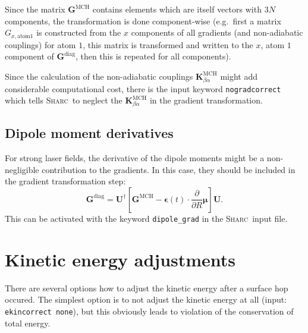 \documentclass[a4paper,11pt,DIV=15,openany,twoside=false]{scrbook}
\newcommand{\sharc}{\textsc{Sharc}}
\newcommand{\ttt}[1]{\texttt{#1}}
\renewcommand{\vec}[1]{\ensuremath{\mathbf{#1}}}
\begin{document}
Since the matrix $\vec{G}^{\text{MCH}}$ contains elements which are itself vectors with $3N$ components, the transformation is done component-wise (e.g.\ first a matrix $G_{x,\text{atom} 1}$ is constructed from the $x$ components of all gradients (and non-adiabatic couplings) for atom $1$, this matrix is transformed and written to the $x$, atom $1$ component of $\vec{G}^{\text{diag}}$, then this is repeated for all components).

Since the calculation of the non-adiabatic couplings $\vec{K}^{\text{MCH}}_{\beta\alpha}$ might add considerable computational cost, there is the input keyword \ttt{nogradcorrect} which tells \sharc\ to neglect the $\vec{K}^{\text{MCH}}_{\beta\alpha}$ in the gradient transformation.

\subsection{Dipole moment derivatives}\label{met:dipolegrad}

For strong laser fields, the derivative of the dipole moments might be a non-negligible contribution to the gradients. In this case, they should be included in the gradient transformation step:
\begin{equation}
  \vec{G}^{\text{diag}}=\vec{U}^\dagger
  \left[
    \vec{G}^{\text{MCH}}
    -\boldsymbol{\epsilon}(t)\cdot\frac{\partial}{\partial R}\boldsymbol{\mu}
  \right]\vec{U}.
\end{equation}
This can be activated with the keyword \ttt{dipole\_grad} in the \sharc\ input file.


\section{Kinetic energy adjustments}\label{met:ekinadj}

There are several options how to adjust the kinetic energy after a surface hop occured. The simplest option is to not adjust the kinetic energy at all (input: \ttt{ekincorrect none}), but this obviously leads to violation of the conservation of total energy.
\end{document}
